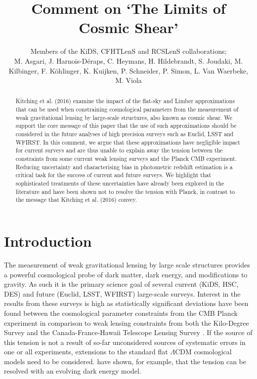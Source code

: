 \documentclass[a4paper, preprint, fleqn, usenatbib]{aastex}
\begin{document}
\title{\huge{Comment on `The Limits of Cosmic Shear'}}

\author{Members of the KiDS, CFHTLenS and RCSLenS collaborations; \\
M. Asgari, J. Harnois-D\'eraps, C. Heymans, H. Hildebrandt, S. Joudaki,  M. Kilbinger, F. K\"ohlinger, K. Kuijken, P. Schneider, P. Simon, L. Van Waerbeke, M. Viola}%


\begin{abstract}
Kitching et al. (2016) examine the impact of the flat-sky and Limber approximations that can be used when constraining cosmological parameters from the measurement of weak gravitational lensing by large-scale structures, also known as cosmic shear.  We support the core message of this paper that the use of such approximations should be considered in the future analyses of high precision surveys such as Euclid, LSST and WFIRST.  In this comment, we argue that these approximations have negligible impact for current surveys and are thus unable to explain away the tension between the constraints from some current weak lensing surveys and the Planck CMB experiment.  Reducing uncertainty and characterising bias in photometric redshift estimation is a critical task for the success of current and future surveys.  We highlight that sophisticated treatments of these uncertainties have already been explored in the literature and have been shown not to resolve the tension with Planck, in contrast to the message that Kitching et al. (2016) convey.

\end{abstract}
\section{Introduction}

The measurement of weak gravitational lensing by large scale structures provides a powerful cosmological probe of dark matter, dark energy, and modifications to gravity.  As such it is the primary science goal of several current (KiDS, HSC, DES) and future (Euclid, LSST, WFIRST) large-scale surveys. Interest in the results from these surveys is high as statistically significant deviations have been found between the cosmological parameter constraints from the CMB Planck experiment \citep{planck/cosmo:2015} in comparison to weak lensing constraints from both the Kilo-Degree Survey \citep[KiDS;][]{hildebrandt/etal:2016} and the Canada-France-Hawaii Telescope Lensing Survey \citep[CFHTLenS;][] {joudaki/etal:2016}.  If the source of this tension is not a result of so-far unconsidered sources of systematic errors in one or all experiments, extensions to the standard flat $\Lambda$CDM cosmological models need to be considered.  \citet{joudaki/etal:2017} have shown, for example, that the tension can be resolved with an evolving dark energy model.
\end{document}
